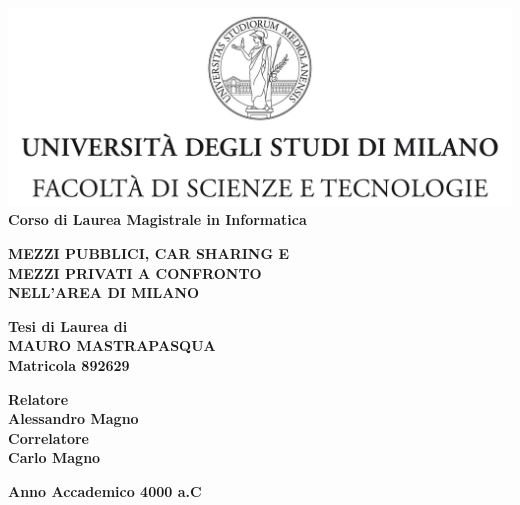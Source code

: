\documentclass[a4paper]{report}
\begin{document}
	\begin{titlepage}
		\begin{center}
			\includegraphics[width=\textwidth]{Logo.jpg}\\
			{\large{\bf Corso di Laurea Magistrale in Informatica}}
		\end{center}
	
		\vspace{14mm}
		\begin{center}
			{\LARGE{\bf MEZZI PUBBLICI, CAR SHARING E}}\\
			\vspace{3mm}
			{\LARGE{\bf MEZZI PRIVATI A CONFRONTO}}\\
			\vspace{4mm}
			{\LARGE{\bf NELL'AREA DI MILANO}}\\
		\end{center}
	
		\vspace{14mm}
		\begin{center}
			{\large{\bf Tesi di Laurea di}}\\
			\vspace{3mm}
			{\Large{\bf MAURO MASTRAPASQUA}}\\
			\vspace{2mm}
			{\large{\bf Matricola 892629}}\\
		\end{center}
	
		\vspace{14mm}
		\begin{flushleft}
			{\normalsize{\bf Relatore}}\\
			\vspace{1mm}
			{\large{\bf Alessandro Magno}}\\
			\vspace{4mm}
			{\normalsize{\bf Correlatore}}\\
			\vspace{1mm}
			{\large{\bf Carlo Magno}}\\
		\end{flushleft}
	
		\vspace{14mm}
		\begin{center}
			{\large{\bf Anno Accademico 4000 a.C}}
		\end{center}
	\end{titlepage}
\end{document}
